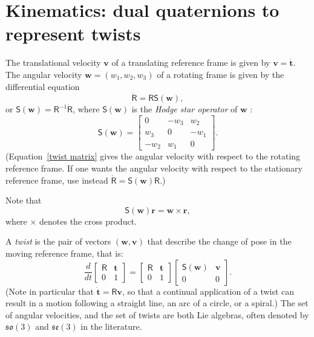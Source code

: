 \documentclass[reqno,12pt]{amsart}
\newcommand\starop[1]{\mathsf S(#1)}
\begin{document}
\section{Kinematics: dual quaternions to represent twists}
\label{sec twists}

The translational velocity $\bm v$ of a translating reference frame is given by $\bm v = \dot{\bm t}$.  The angular velocity $\bm w = (w_1, w_2, w_3)$ of a rotating frame is given by the differential equation
\begin{equation}
\label{twist matrix}
\dot{\mathsf R} = \mathsf R \starop{\bm w},
\end{equation}
or $\starop{\bm w} = \mathsf R^{-1} \dot{\mathsf R}$,
where $\starop{\bm w}$ is the \emph{Hodge star operator} of $\bm w$ \cite{wiki0}:
\begin{equation}
\starop{\bm w} = \begin{bmatrix}  0   & -w_3 &  w_2 \\
                               w_3 &  0   & -w_1 \\
                              -w_2 &  w_1 &  0 \end{bmatrix} .
\end{equation}
(Equation~\eqref{twist matrix} gives the angular velocity with respect to the rotating reference frame.  If one wants the angular velocity with respect to the stationary reference frame, use instead $\dot{\mathsf R} = \starop{\bm w} \mathsf R$.)

Note that
\begin{equation}
\label{w star to w cross}
\starop{\bm w} \bm r = \bm w \times \bm r ,
\end{equation}
where $\times$ denotes the cross product.

A \emph{twist} is the pair of vectors $(\bm w, \bm v)$ that describe the change of pose in the moving reference frame, that is:
\begin{equation}
\label{ode twist}
\frac d{dt} \begin{bmatrix} \mathsf R & \bm t \\ 0 & 1 \end{bmatrix}
= \begin{bmatrix} \mathsf R & \bm t \\ 0 & 1 \end{bmatrix}
\begin{bmatrix} \starop{\bm w} & \bm v \\ 0 & 0 \end{bmatrix}.
\end{equation}
(Note in particular that $\dot{\bm t} = \mathsf R \bm v$, so that a continual application of a twist can result in a motion following a straight line, an arc of a circle, or a spiral.)  The set of angular velocities, and the set of twists are both Lie algebras, often denoted by $\mathfrak{so}(3)$ and $\mathfrak{se}(3)$ in the literature.
\end{document}
